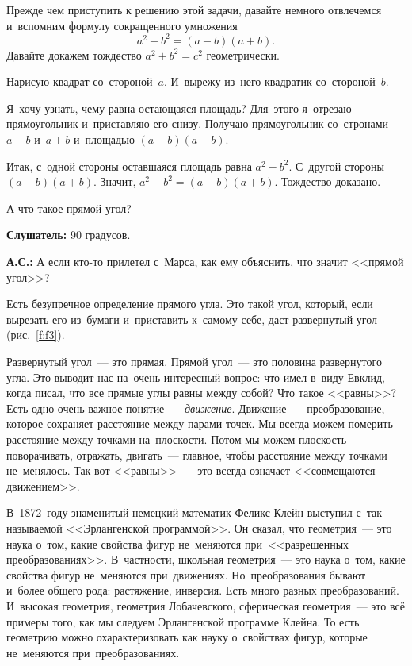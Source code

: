 
Прежде чем приступить к решению этой задачи, давайте немного отвлечемся и~вспомним формулу сокращенного умножения
$$
a^{2}-b^{2}=(a-b)(a+b).
$$
Давайте докажем тождество $a^{2}+b^{2}=c^{2}$ геометрически.


Нарисую квадрат со~стороной~$a$. И~вырежу из~него квадратик со~стороной~$b$.




Я~хочу узнать, чему равна остающаяся площадь? Для~этого я~отрезаю прямоугольник и~приставляю его
снизу. Получаю прямоугольник со~стронами $a-b$ и~$a+b$ и~площадью $(a-b)(a+b)$.

Итак, с~одной стороны оставшаяся площадь равна $a^{2}-b^{2}$. С~другой стороны $(a-b)(a+b)$. Значит,
$a^{2}-b^{2}=(a-b)(a+b)$. Тождество доказано.


А что такое прямой угол?

\textbf{Слушатель:} 90 градусов.

\textbf{А.С.:} А если кто-то прилетел с~Марса, как ему объяснить, что значит <<прямой угол>>?

Есть безупречное определение прямого угла. Это такой угол, который, если вырезать его из~бумаги и~приставить к~самому себе, даст развернутый
угол (рис.~\ref{f:f3}).


Развернутый угол~--- это прямая. Прямой угол~--- это половина развернутого угла. Это выводит нас
на~очень интересный вопрос: что имел в~виду Евклид, когда писал, что все прямые углы равны между
собой? Что такое <<равны>>? Есть одно очень важное понятие~--- \textit{движение}. Движение~---
преобразование, которое сохраняет расстояние между парами точек. Мы всегда можем померить
расстояние между точками на~плоскости. Потом мы можем плоскость поворачивать, отражать, двигать~---
главное, чтобы расстояние между точками не~менялось. Так вот <<равны>>~--- это всегда означает
<<совмещаются движением>>.

В~1872~году знаменитый немецкий математик Феликс Клейн выступил с~так называемой <<Эрлангенской
программой>>. Он сказал, что геометрия~--- это наука о~том, какие свойства фигур не~меняются
при~<<разрешенных преобразованиях>>. В~частности, школьная геометрия~--- это наука о~том, какие свойства фигур
не~меняются при~движениях. Но~преобразования бывают и~более общего рода: растяжение, инверсия. Есть
много разных преобразований. И~высокая геометрия, геометрия Лобачевского, сферическая геометрия~---
это всё примеры того, как мы следуем Эрлангенской программе Клейна. То есть геометрию можно охарактеризовать как науку
о~свойствах фигур, которые не~меняются при~преобразованиях.

